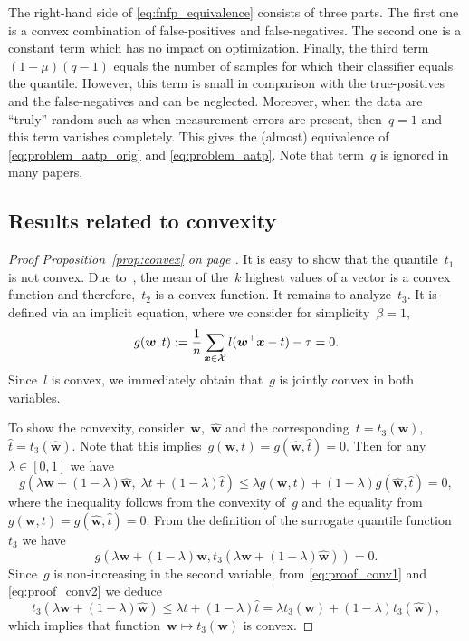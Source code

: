 The right-hand side of \eqref{eq:fnfp_equivalence} consists of three parts. The first one is a convex combination of false-positives and false-negatives. The second one is a constant term which has no impact on optimization. Finally, the third term~$(1-\mu)\left(q - 1\right)$ equals the number of samples for which their classifier equals the quantile. However, this term is small in comparison with the true-positives and the false-negatives and can be neglected. Moreover, when the data are ``truly'' random such as when measurement errors are present, then~$q=1$ and this term vanishes completely. This gives the (almost) equivalence of \eqref{eq:problem_aatp_orig} and \eqref{eq:problem_aatp}. Note that term~$q$ is ignored in many papers.

\subsection{Results related to convexity}

\propconvex*
\begin{proof}[Proof Proposition~\ref{prop:convex} on page \pageref{prop:convex}]
  It is easy to show that the quantile~$t_1$ is not convex. Due to~\cite{lapin2015top}, the mean of the~$k$ highest values of a vector is a convex function and therefore,~$t_2$ is a convex function. It remains to analyze~$t_3$. It is defined via an implicit equation, where we consider for simplicity~$\beta=1$,
  \begin{equation*}
    g(\bm{w},t) := \frac{1}{n}\sum_{\bm{x} \in \mathcal{X}} l(\bm{w}^\top \bm{x}-t) - \tau = 0.
  \end{equation*}
  Since~$l$ is convex, we immediately obtain that~$g$ is jointly convex in both variables.

  To show the convexity, consider~$\bm{w}$,~$\hat{\bm{w}}$ and the corresponding~$t= t_3(\bm{w})$,~$\hat{t}=t_3(\hat{\bm{w}})$. Note that this implies~$g(\bm{w}, t)=g(\hat{\bm{w}},\hat{t})=0$. Then for any~$\lambda\in[0,1]$ we have 
  \begin{equation}\label{eq:proof_conv1}
    g(\lambda \bm{w} + (1 - \lambda)\hat{\bm{w}},\;\lambda t + (1 - \lambda)\hat{t})
    \le \lambda g(\bm{w}, t) + (1 - \lambda) g(\hat{\bm{w}}, \hat{t}) = 0,
  \end{equation}
  where the inequality follows from the convexity of~$g$ and the equality from~$g(\bm{w}, t) = g(\hat{\bm{w}}, \hat{t})=0.$
  From the definition of the surrogate quantile function~$t_3$ we have
  \begin{equation}\label{eq:proof_conv2}
    g(\lambda\bm{w} + (1-\lambda)\hat{\bm{w}}, t_3(\lambda\bm{w} + (1-\lambda)\hat{\bm{w}})) = 0.
  \end{equation}
  Since~$g$ is non-increasing in the second variable, from \eqref{eq:proof_conv1} and \eqref{eq:proof_conv2} we deduce
  \begin{equation*}
    t_3(\lambda\bm{w} + (1-\lambda)\hat{\bm{w}})
    \le \lambda t + (1-\lambda)\hat{t}
    =   \lambda t_3(\bm{w})+(1-\lambda) t_3(\hat{\bm{w}}),
  \end{equation*}
  which implies that function~$\bm{w}\mapsto t_3(\bm{w})$ is convex.
\end{proof}

